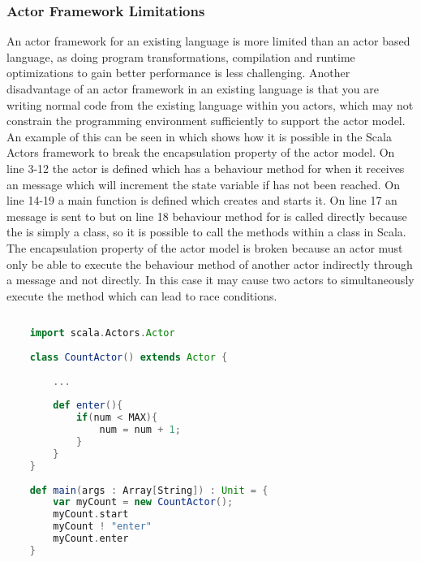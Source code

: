 \subsubsection{Actor Framework Limitations}
An actor framework for an existing language is more limited than an actor based language, as doing program transformations, compilation and runtime optimizations to gain better performance is less challenging\cite[p. 5]{karmani2011actors}. Another disadvantage of an actor framework in an existing language is that you are writing normal code from the existing language within you actors, which may not constrain the programming environment sufficiently to support the actor model. An example of this can be seen in  which shows how it is possible in the Scala Actors framework to break the encapsulation property of the actor model. On line 3-12 the  actor is defined which has a behaviour method for when it receives an  message which will increment the state variable  if  has not been reached. On line 14-19 a main function is defined which creates  and starts it. On line 17 an  message is sent to  but on line 18 behaviour method for  is called directly because the  is simply a class, so it is possible to call the methods within a class in Scala. The encapsulation property of the actor model is broken because an actor must only be able to execute the behaviour method of another actor indirectly through a message and not directly. In this case it may cause two actors to simultaneously execute the  method which can lead to race conditions. 

\begin{lstlisting}[label=lst:actor_state_encapsulation_violation,
  caption={Scala Actors violating state encapsulation},
  language=Scala,  
  showspaces=false,
  showtabs=false,
  breaklines=true,
  showstringspaces=false,
  breakatwhitespace=true,
  commentstyle=\color{greencomments},
  keywordstyle=\color{bluekeywords},
  stringstyle=\color{redstrings}]  % Start your code-block
	
	import scala.Actors.Actor
	
	class CountActor() extends Actor {
				
		...
		
		def enter(){
			if(num < MAX){
				num = num + 1;
			}
		}
	}
	
	def main(args : Array[String]) : Unit = {
		var myCount = new CountActor();
		myCount.start
		myCount ! "enter"
		myCount.enter
	}
\end{lstlisting}

